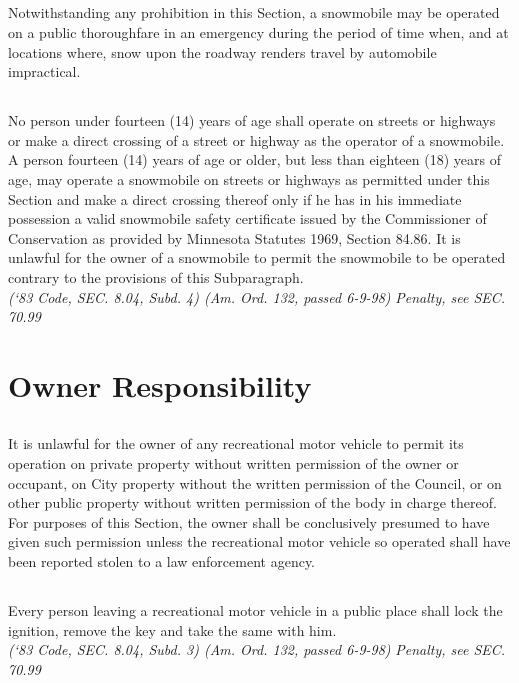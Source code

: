 \documentclass[code.tex]{subfiles}
\begin{document}
\subsection{}
Notwithstanding any prohibition in this Section, a snowmobile may be operated on a public thoroughfare in an emergency during the period of time when, and at locations where, snow upon the roadway renders travel by automobile impractical.
\subsection{}
No person under fourteen (14) years of age shall operate on streets or highways or make a direct crossing of a street or highway as the operator of a snowmobile. A person fourteen (14) years of age or older, but less than eighteen (18) years of age, may operate a snowmobile on streets or highways as permitted under this Section and make a direct crossing thereof only if he has in his immediate possession a valid snowmobile safety certificate issued by the Commissioner of Conservation as provided by Minnesota Statutes 1969, Section 84.86. It is unlawful for the owner of a snowmobile to permit the snowmobile to be operated contrary to the provisions of this Subparagraph.\\
\emph{(‘83 Code, SEC. 8.04, Subd. 4) (Am. Ord. 132, passed 6-9-98)}
\emph{Penalty, see SEC. 70.99}
\section{Owner Responsibility}
\subsection{}
It is unlawful for the owner of any recreational motor vehicle to permit its operation on private property without written permission of the owner or occupant, on City property without the written permission of the Council, or on other public property without written permission of the body in charge thereof. For purposes of this Section, the owner shall be conclusively presumed to have given such permission unless the recreational motor vehicle so operated shall have been reported stolen to a law enforcement agency.
\subsection{}
Every person leaving a recreational motor vehicle in a public place shall lock the ignition, remove the key and take the same with him.\\
\emph{(‘83 Code, SEC. 8.04, Subd. 3) (Am. Ord. 132, passed 6-9-98)}
\emph{Penalty, see SEC. 70.99}
\end{document}
